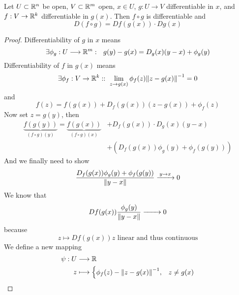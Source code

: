 \documentclass[../../script.tex]{subfiles}
\begin{document}
\begin{thm}
    Let $U \subset \mathbb{R}^n$ be open, $V \subset \mathbb{R}^m$ open, $x \in U$, $g: U \rightarrow V$ differentiable in $x$, and $f: V \rightarrow \mathbb{R}^k$ differentiable in $g(x)$.
    Then $f \circ g$ is differentiable and 
    \[
        D(f \circ g) = Df(g(x)) \cdot Dg(x)
    \]
\end{thm}
\begin{proof}
    Differentiability of $g$ in $x$ means
    \begin{equation}
        \exists \phi_g: U \longrightarrow \mathbb{R}^m: ~~g(y) - g(x) = D_g(x)(y-x) + \phi_g(y)
    \end{equation}
    Differentiability of $f$ in $g(x)$ means 
    \begin{equation}
        \exists \phi_f: V \rightarrow \mathbb{R}^k:: ~\lim_{z \rightarrow g(x)} \phi_f(z) {\norm{z - g(x)}}^{-1} = 0
    \end{equation}
    and 
    \begin{equation}
        f(z) = f(g(x)) + D_f(g(x))(z - g(x)) + \phi_f(z)
    \end{equation}
    Now set $z = g(y)$, then 
    \begin{equation}
        \begin{split}
            \underbrace{f(g(y))}_{(f \circ g)(y)} = \underbrace{f(g(x))}_{(f \circ g)(x)} &+ D_f(g(x)) \cdot D_g(x)(y-x) \\
            &+ (D_f(g(x)) \phi_g(y) + \phi_f(g(y)))
        \end{split}
    \end{equation}
    And we finally need to show 
    \begin{equation}
        \frac{D_f(g(x)) \phi_g(y) + \phi_f(g(y))}{\norm{y - x}} \conv{y \rightarrow x} 0
    \end{equation}
    We know that 
    \begin{equation}
        Df(g(x)) \frac{\phi_g(y)}{\norm{y - x}} \conv{} 0
    \end{equation}
    because
    \begin{equation}
        z \longmapsto Df(g(x)) z \text{ linear and thus continuous}
    \end{equation}
    We define a new mapping 
    \begin{equation}
    \begin{split}
        \psi: U &\longrightarrow \mathbb{R} \\
        z &\longmapsto \begin{cases}
            \phi_f(z) - {\norm{z - g(x)}}^{-1}, & z \ne g(x) \\

\end{cases}
\end{split}
\end{equation}
\end{proof}
\end{document}
